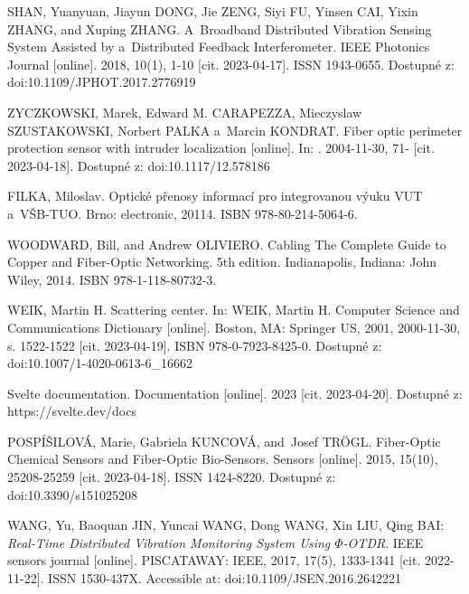 

\begin{thebibliography}{99}


SHAN, Yuanyuan, Jiayun DONG, Jie ZENG, Siyi FU, Yinsen CAI, Yixin ZHANG, and Xuping ZHANG. A~Broadband Distributed Vibration Sensing System Assisted by a~Distributed Feedback Interferometer. IEEE Photonics Journal [online]. 2018, 10(1), 1-10 [cit. 2023-04-17]. ISSN 1943-0655. Dostupné z: doi:10.1109/JPHOT.2017.2776919

ZYCZKOWSKI, Marek, Edward M. CARAPEZZA, Mieczyslaw SZUSTAKOWSKI, Norbert PALKA a~Marcin KONDRAT. Fiber optic perimeter protection sensor with intruder localization [online]. In: . 2004-11-30, 71- [cit. 2023-04-18]. Dostupné z: doi:10.1117/12.578186

FILKA, Miloslav. Optické přenosy informací pro integrovanou výuku VUT a~VŠB-TUO. Brno: electronic, 20114. ISBN 978-80-214-5064-6.

WOODWARD, Bill, and Andrew OLIVIERO. Cabling The Complete Guide to Copper and Fiber-Optic Networking. 5th edition. Indianapolis, Indiana: John Wiley, 2014. ISBN 978-1-118-80732-3.

WEIK, Martin H. Scattering center. In: WEIK, Martin H. Computer Science and Communications Dictionary [online]. Boston, MA: Springer US, 2001, 2000-11-30, s. 1522-1522 [cit. 2023-04-19]. ISBN 978-0-7923-8425-0. Dostupné z: doi:10.1007/1-4020-0613-6\_16662

Svelte documentation. Documentation [online]. 2023 [cit. 2023-04-20]. Dostupné z: https://svelte.dev/docs

POSPÍŠILOVÁ, Marie, Gabriela KUNCOVÁ, and~Josef TRÖGL. Fiber-Optic Chemical Sensors and Fiber-Optic Bio-Sensors. Sensors [online]. 2015, 15(10), 25208-25259 [cit. 2023-04-18]. ISSN 1424-8220. Dostupné z: doi:10.3390/s151025208


WANG, Yu, Baoquan JIN, Yuncai WANG, Dong WANG, Xin LIU, Qing BAI: \emph{Real-Time Distributed Vibration Monitoring System Using $\Phi$-OTDR}. IEEE sensors journal [online]. PISCATAWAY: IEEE, 2017, 17(5), 1333-1341 [cit. 2022-11-22]. ISSN 1530-437X. Accessible at: doi:10.1109/JSEN.2016.2642221


\end{thebibliography}
